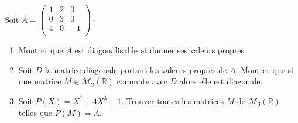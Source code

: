 \documentclass[a4paper,10pt]{report}
\begin{document}
\begin{Exercice}{}Soit $A= \begin{pmatrix}
1 & 2 & 0 \\
0 & 3 & 0 \\
4 & 0 & -1 \\
\end{pmatrix}\cdot$
\begin{enumerate}
\item Montrer que $A$ est diagonalisable et donner ses valeurs propres.
\item Soit $D$ la matrice diagonale portant les valeurs propres de $A$. Montrer que si une matrice $M \in \mathcal{M}_3(\mathbb{R})$ commute avec $D$ alors elle est diagonale.
\item Soit $P(X)=X^7+ 4X^3+1$. Trouver toutes les matrices $M$ de $\mathcal{M}_3(\mathbb{R})$ telles que $P(M)=A$.
\end{enumerate}
\end{Exercice}

\corr 
\end{document}
